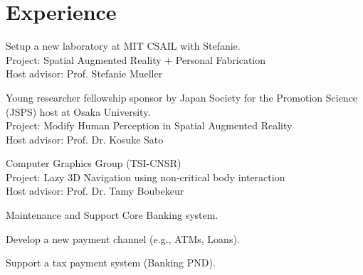 \documentclass[]{resume-enhanced}
\begin{document}
%
%



\section{Experience}
\begin{minipage}[t]{0.55\textwidth} 
	
\vspace{\topsep} %
Setup a new laboratory at MIT CSAIL with Stefanie. \\
Project: Spatial Augmented Reality + Personal Fabrication \\
Host advisor: Prof. Stefanie Mueller
\sectionsep

\vspace{\topsep} %
Young researcher fellowship sponsor by Japan Society for the Promotion Science (JSPS) 
host at Osaka University. \\
Project: Modify Human Perception in Spatial Augmented Reality \\
Host advisor: Prof. Dr. Kosuke Sato
\sectionsep
	
\vspace{\topsep} %
Computer Graphics Group (TSI-CNSR) \\
Project: Lazy 3D Navigation using non-critical body interaction \\
Host advisor: Prof. Dr. Tamy Boubekeur
\sectionsep

\begin{tightemize}
	\item Maintenance and Support Core Banking system.
	\item Develop a new payment channel (e.g., ATMs, Loans).
	\item Support a tax payment system (Banking PND).
\end{tightemize}
\sectionsep


\end{minipage}
\end{document}
